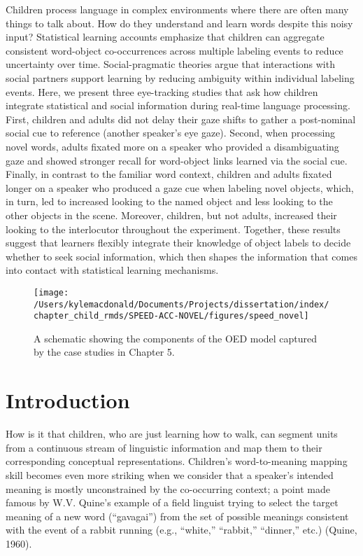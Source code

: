 \documentclass[oneside]{report}
\begin{document}
Children process language in complex environments where there are often
many things to talk about. How do they understand and learn words
despite this noisy input? Statistical learning accounts emphasize that
children can aggregate consistent word-object co-occurrences across
multiple labeling events to reduce uncertainty over time.
Social-pragmatic theories argue that interactions with social partners
support learning by reducing ambiguity within individual labeling
events. Here, we present three eye-tracking studies that ask how
children integrate statistical and social information during real-time
language processing. First, children and adults did not delay their gaze
shifts to gather a post-nominal social cue to reference (another
speaker's eye gaze). Second, when processing novel words, adults fixated
more on a speaker who provided a disambiguating gaze and showed stronger
recall for word-object links learned via the social cue. Finally, in
contrast to the familiar word context, children and adults fixated
longer on a speaker who produced a gaze cue when labeling novel objects,
which, in turn, led to increased looking to the named object and less
looking to the other objects in the scene. Moreover, children, but not
adults, increased their looking to the interlocutor throughout the
experiment. Together, these results suggest that learners flexibly
integrate their knowledge of object labels to decide whether to seek
social information, which then shapes the information that comes into
contact with statistical learning mechanisms.
\begin{figure}[!t]

{\centering \texttt{[image: /Users/kylemacdonald/Documents/Projects/dissertation/index/chapter\_child\_rmds/SPEED-ACC-NOVEL/figures/speed\_novel]} 

}

\caption[Overview of Chapter 5.]{A schematic showing the components of the OED model captured by the case studies in Chapter 5.}\label{fig:schematic-speed-novel}
\end{figure}
\section{Introduction}\label{introduction-4}

How is it that children, who are just learning how to walk, can segment
units from a continuous stream of linguistic information and map them to
their corresponding conceptual representations. Children's
word-to-meaning mapping skill becomes even more striking when we
consider that a speaker's intended meaning is mostly unconstrained by
the co-occurring context; a point made famous by W.V. Quine's example of
a field linguist trying to select the target meaning of a new word
(``gavagai'') from the set of possible meanings consistent with the
event of a rabbit running (e.g., ``white,'' ``rabbit,'' ``dinner,''
etc.) (Quine, 1960).
\end{document}
